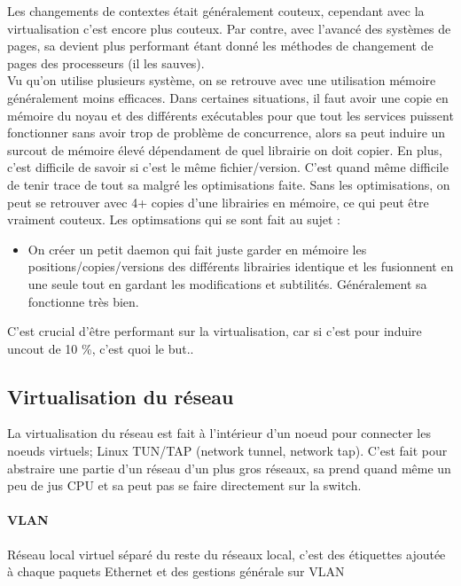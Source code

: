 \documentclass[oneside]{book}
\begin{document}
Les changements de contextes était généralement couteux, cependant avec la virtualisation c'est encore plus couteux. Par contre, avec l'avancé des systèmes de pages, sa devient plus performant étant donné les méthodes de changement de pages des processeurs (il les sauves).\\

Vu qu'on utilise plusieurs système, on se retrouve avec une utilisation mémoire généralement moins efficaces. Dans certaines situations, il faut avoir une copie en mémoire du noyau et des différents exécutables pour que tout les services puissent fonctionner sans avoir trop de problème de concurrence, alors sa peut induire un surcout de mémoire élevé dépendament de quel librairie on doit copier. En plus, c'est difficile de savoir si c'est le même fichier/version. C'est quand même difficile de tenir trace de tout sa malgré les optimisations faite. Sans les optimisations, on peut se retrouver avec 4+ copies d'une librairies en mémoire, ce qui peut être vraiment couteux. Les optimsations qui se sont fait au sujet :\\

\begin{itemize}
\item On créer un petit daemon qui fait juste garder en mémoire les positions/copies/versions des différents librairies identique et les fusionnent en une seule tout en gardant les modifications et subtilités. Généralement sa fonctionne très bien.
\end{itemize}

C'est crucial d'être performant sur la virtualisation, car si c'est pour induire uncout de 10 \%, c'est quoi le but..


\subsection{Virtualisation du réseau}
La virtualisation du réseau est fait à l'intérieur d'un noeud pour connecter les noeuds virtuels; Linux TUN/TAP (network tunnel, network tap). C'est fait pour abstraire une partie d'un réseau d'un plus gros réseaux, sa prend quand même un peu de jus CPU et sa peut pas se faire directement sur la switch. \\

\paragraph{VLAN}
Réseau local virtuel séparé du reste du réseaux local, c'est des étiquettes ajoutée à chaque paquets Ethernet et des gestions générale sur VLAN
\end{document}
